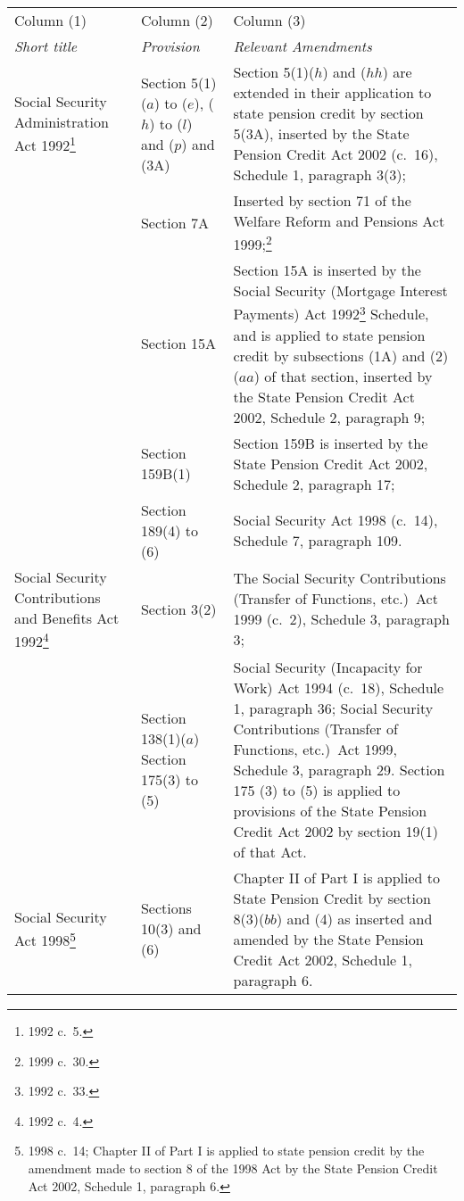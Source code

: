\documentclass[12pt,a4paper]{article}
\begin{document}
{\footnotesize{}
\begin{longtable}{p{66.02693pt}p{59.43776pt}p{228.52734pt}}
\hline
Column (1)	&Column (2)	&Column (3)\\
\itshape Short title	& \itshape Provision	& \itshape Relevant Amendments\\
\hline
\endhead
\hline
\endlastfoot
Social Security Administration Act 1992\footnote{1992 c.\ 5.}	&Section 5(1) ($a$)  to ($e$), ($h$)  to ($l$) and ($p$)  and (3A)	&Section 5(1)($h$)  and ($hh$)  are extended in their application to state pension credit by section 5(3A), inserted by the State Pension Credit Act 2002 (c.\ 16), Schedule 1, paragraph 3(3);\\
&	Section 7A	&Inserted by section 71 of the Welfare Reform and Pensions Act 1999;\footnote{1999 c.\ 30.}\\
	&Section 15A	&Section 15A is inserted by the Social Security (Mortgage Interest Payments) Act 1992\footnote{1992 c.\ 33.} Schedule, and is applied to state pension credit by subsections (1A) and (2)($aa$)  of that section, inserted by the State Pension Credit Act 2002, Schedule 2, paragraph 9;\\
	&Section 159B(1)	&Section 159B is inserted by the State Pension Credit Act 2002, Schedule 2, paragraph 17;\\
	&Section 189(4) to (6)	&Social Security Act 1998 (c.\ 14), Schedule 7, paragraph 109.\\
Social Security Contributions and Benefits Act 1992\footnote{1992 c.\ 4.}	&Section 3(2)	&The Social Security Contributions (Transfer of Functions, etc.)\ Act 1999 (c.\ 2), Schedule 3, paragraph 3;\\
	&Section 138(1)($a$) \newline
Section 175(3) to (5)
&Social Security (Incapacity for Work) Act 1994 (c.\ 18), Schedule 1, paragraph 36; 
Social Security Contributions (Transfer of Functions, etc.)\ Act 1999, Schedule 3, paragraph 29. Section 175 (3) to (5) is applied to provisions of the State Pension Credit Act 2002 by section 19(1) of that Act.\\
Social Security Act 1998\footnote{1998 c.\ 14; Chapter II of Part I is applied to state pension credit by the amendment made to section 8 of the 1998 Act by the State Pension Credit Act 2002, Schedule 1, paragraph 6.}	&Sections 10(3) and (6)	&Chapter II of Part I is applied to State Pension Credit by section 8(3)($bb$)  and (4) as inserted and amended by the State Pension Credit Act 2002, Schedule 1, paragraph 6.\\

\end{longtable}}
\end{document}
